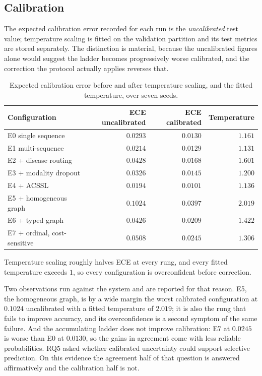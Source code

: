 \documentclass[12pt,a4paper]{report}
\begin{document}
\subsection{Calibration}
\label{sec:results-calibration}

The expected calibration error recorded for each run is the \emph{uncalibrated}
test value; temperature scaling is fitted on the validation partition and its
test metrics are stored separately. The distinction is material, because the
uncalibrated figures alone would suggest the ladder becomes progressively worse
calibrated, and the correction the protocol actually applies reverses that.

\begin{table}[htbp]
\centering
\caption{Expected calibration error before and after temperature scaling, and
the fitted temperature, over seven seeds.}
\label{tab:calibration}
\begin{tabular}{lrrr}
\toprule
Configuration & ECE uncalibrated & ECE calibrated & Temperature \\
\midrule
E0 single sequence & $0.0293$ & $0.0130$ & $1.161$ \\
E1 multi-sequence & $0.0214$ & $0.0129$ & $1.131$ \\
E2 + disease routing & $0.0428$ & $0.0168$ & $1.601$ \\
E3 + modality dropout & $0.0326$ & $0.0145$ & $1.200$ \\
E4 + ACSSL & $0.0194$ & $\mathbf{0.0101}$ & $1.136$ \\
E5 + homogeneous graph & $0.1024$ & $0.0397$ & $2.019$ \\
E6 + typed graph & $0.0426$ & $0.0209$ & $1.422$ \\
E7 + ordinal, cost-sensitive & $0.0508$ & $0.0245$ & $1.306$ \\
\bottomrule
\end{tabular}
\end{table}

Temperature scaling roughly halves ECE at every rung, and every fitted
temperature exceeds $1$, so every configuration is overconfident before
correction.

Two observations run against the system and are reported for that reason. E5,
the homogeneous graph, is by a wide margin the worst calibrated configuration at
$0.1024$ uncalibrated with a fitted temperature of $2.019$; it is also the rung
that fails to improve accuracy, and its overconfidence is a second symptom of
the same failure. And the accumulating ladder does not improve calibration: E7
at $0.0245$ is worse than E0 at $0.0130$, so the gains in agreement come with
less reliable probabilities. RQ5 asked whether calibrated uncertainty could
support selective prediction. On this evidence the agreement half of that
question is answered affirmatively and the calibration half is not.
\end{document}
